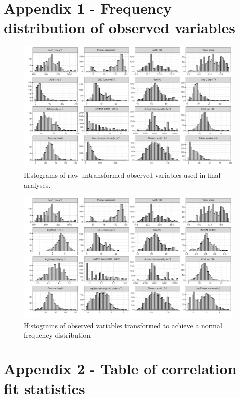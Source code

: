 \documentclass[11pt,a4paper]{article}
\begin{document}
\section{Appendix 1 - Frequency distribution of observed variables} \label{appendixa}

\begin{figure}[H]
\centering
	\includegraphics[width=\textwidth]{hist_raw}
	\caption{Histograms of raw untransformed observed variables used in final analyses.}
	\label{hist_raw}
\end{figure}

\begin{figure}[H]
\centering
	\includegraphics[width=\textwidth]{hist_trans}
	\caption{Histograms of observed variables transformed to achieve a normal frequency distribution.}
	\label{hist_trans}
\end{figure}

\appendix{}
\section{Appendix 2 - Table of correlation fit statistics} \label{appendixb}
\end{document}
